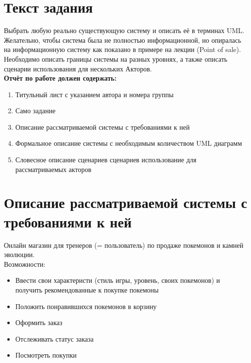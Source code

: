 \documentclass[12pt,onecolumn]{article}
\begin{document}
\section{Текст задания}
Выбрать любую реально существующую систему и описать её в терминах UML. Желательно, чтобы система была не полностью информационной, но опиралась на информационную систему как показано в примере на лекции (Point of sale). Необходимо описать границы системы на разных уровнях, а также описать сценарии использования для нескольких Акторов.\\
\textbf{Отчёт по работе должен содержать:}
\begin{enumerate}
  \item Титульный лист с указанием автора и номера группы
  \item Само задание
  \item Описание рассматриваемой системы с требованиями к ней
  \item Формальное описание системы с необходимым количеством UML диаграмм
  \item Словесное описание сценариев сценариев использование для рассматриваемых акторов
\end{enumerate}
\section{Описание рассматриваемой системы с требованиями к ней}
Онлайн магазин для тренеров (= пользователь) по продаже покемонов и камней эволюции.\\
Возможности:
\begin{itemize}
  \item Ввести свои характеристи (стиль игры, уровень, своих покемонов) и получить рекомендованные к покупке покемоны
  \item Положить понравившихся покемонов в корзину
  \item Оформить заказ
  \item Отслеживать статус заказа
  \item Посмотреть покупки
\end{itemize}
\end{document}

